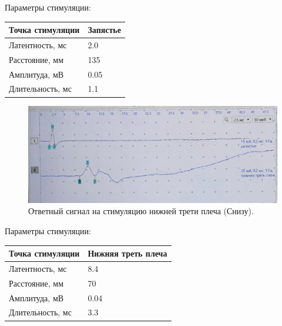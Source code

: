 \documentclass{article}
\begin{document}
            \begin{center}
                Параметры стимуляции:    
            \end{center}
            
            \begin{center}
                \begin{tabular}{|l|l|}
                    \hline
                    Точка стимуляции & Запястье \\ \hline
                    Латентность, мс & 2.0 \\ \hline
                    Расстояние, мм & 135 \\ \hline
                    Амплитуда, мВ & 0.05 \\ \hline
                    Длительность, мс & 1.1  \\ \hline
                \end{tabular}
            \end{center}
            \newpage

            \begin{figure}[h]
                \centering
                \includegraphics[width=\textwidth]{data/1,2.jpg}
                \caption{Ответный сигнал на стимуляцию нижней трети плеча (Снизу).}
            \end{figure}

            \begin{center}
                Параметры стимуляции:    
            \end{center}

            \begin{center}
                \begin{tabular}{|l|l|}
                    \hline
                    Точка стимуляции & Нижняя треть плеча \\ \hline
                    Латентность, мс & 8.4 \\ \hline
                    Расстояние, мм & 70 \\ \hline
                    Амплитуда, мВ & 0.04 \\ \hline
                    Длительность, мс & 3.3  \\ \hline
                \end{tabular}
            \end{center}
            \newpage
\end{document}
